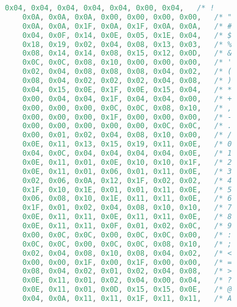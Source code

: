 \begin{lstlisting}[language=C]
    0x04, 0x04, 0x04, 0x04, 0x04, 0x00, 0x04,   /* !                        */
    0x0A, 0x0A, 0x0A, 0x00, 0x00, 0x00, 0x00,   /* "                        */
    0x0A, 0x0A, 0x1F, 0x0A, 0x1F, 0x0A, 0x0A,   /* #                        */
    0x04, 0x0F, 0x14, 0x0E, 0x05, 0x1E, 0x04,   /* $                        */
    0x18, 0x19, 0x02, 0x04, 0x08, 0x13, 0x03,   /* %                        */
    0x08, 0x14, 0x14, 0x08, 0x15, 0x12, 0x0D,   /* &                        */
    0x0C, 0x0C, 0x08, 0x10, 0x00, 0x00, 0x00,   /* '                        */
    0x02, 0x04, 0x08, 0x08, 0x08, 0x04, 0x02,   /* (                        */
    0x08, 0x04, 0x02, 0x02, 0x02, 0x04, 0x08,   /* )                        */
    0x04, 0x15, 0x0E, 0x1F, 0x0E, 0x15, 0x04,   /* *                        */
    0x00, 0x04, 0x04, 0x1F, 0x04, 0x04, 0x00,   /* +                        */
    0x00, 0x00, 0x00, 0x0C, 0x0C, 0x08, 0x10,   /* ,                        */
    0x00, 0x00, 0x00, 0x1F, 0x00, 0x00, 0x00,   /* -                        */
    0x00, 0x00, 0x00, 0x00, 0x00, 0x0C, 0x0C,   /* .                        */
    0x00, 0x01, 0x02, 0x04, 0x08, 0x10, 0x00,   /* /                        */
    0x0E, 0x11, 0x13, 0x15, 0x19, 0x11, 0x0E,   /* 0                        */
    0x04, 0x0C, 0x04, 0x04, 0x04, 0x04, 0x0E,   /* 1                        */
    0x0E, 0x11, 0x01, 0x0E, 0x10, 0x10, 0x1F,   /* 2                        */
    0x0E, 0x11, 0x01, 0x06, 0x01, 0x11, 0x0E,   /* 3                        */
    0x02, 0x06, 0x0A, 0x12, 0x1F, 0x02, 0x02,   /* 4                        */
    0x1F, 0x10, 0x1E, 0x01, 0x01, 0x11, 0x0E,   /* 5                        */
    0x06, 0x08, 0x10, 0x1E, 0x11, 0x11, 0x0E,   /* 6                        */
    0x1F, 0x01, 0x02, 0x04, 0x08, 0x10, 0x10,   /* 7                        */
    0x0E, 0x11, 0x11, 0x0E, 0x11, 0x11, 0x0E,   /* 8                        */
    0x0E, 0x11, 0x11, 0x0F, 0x01, 0x02, 0x0C,   /* 9                        */
    0x00, 0x0C, 0x0C, 0x00, 0x0C, 0x0C, 0x00,   /* :                        */
    0x0C, 0x0C, 0x00, 0x0C, 0x0C, 0x08, 0x10,   /* ;                        */
    0x02, 0x04, 0x08, 0x10, 0x08, 0x04, 0x02,   /* <                        */
    0x00, 0x00, 0x1F, 0x00, 0x1F, 0x00, 0x00,   /* =                        */
    0x08, 0x04, 0x02, 0x01, 0x02, 0x04, 0x08,   /* >                        */
    0x0E, 0x11, 0x01, 0x02, 0x04, 0x00, 0x04,   /* ?                        */
    0x0E, 0x11, 0x01, 0x0D, 0x15, 0x15, 0x0E,   /* @                        */
    0x04, 0x0A, 0x11, 0x11, 0x1F, 0x11, 0x11,   /* A                        */

\end{lstlisting}
